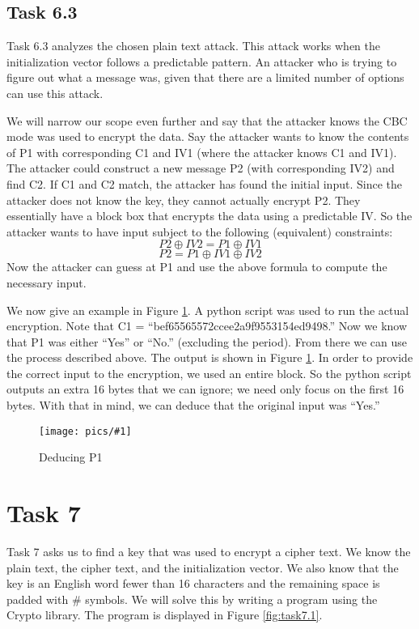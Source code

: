 \documentclass[11pt]{article}
\newcommand{\fig}[2]{ 
\begin{figure}[h]
	\centering
	\caption{#2}
	\texttt{[image: pics/\#1]}
	\label{fig:#1}
\end{figure} 
}
\begin{document}
\subsection*{Task 6.3}

Task 6.3 analyzes the chosen plain text attack. This attack works when the initialization vector follows a predictable pattern. An attacker who is trying to figure out what a message was, given that there are a limited number of options can use this attack.

We will narrow our scope even further and say that the attacker knows the CBC mode was used to encrypt the data. Say the attacker wants to know the contents of P1 with corresponding C1 and IV1 (where the attacker knows C1 and IV1). The attacker could construct a new message P2 (with corresponding IV2) and find C2. If C1 and C2 match, the attacker has found the initial input. Since the attacker does not know the key, they cannot actually encrypt P2. They essentially have a block box that encrypts the data using a predictable IV. So the attacker wants to have input subject to the following (equivalent) constraints:
$$ P2 \oplus IV2 = P1 \oplus IV1 $$
$$ P2 = P1 \oplus IV1 \oplus IV2 $$
Now the attacker can guess at P1 and use the above formula to compute the necessary input.

We now give an example in Figure \ref{fig:task6.3.1}. A python script was used to run the actual encryption. Note that C1 = ``bef65565572ccee2a9f9553154ed9498.'' Now we know that P1 was either ``Yes'' or ``No.'' (excluding the period). From there we can use the process described above. The output is shown in Figure \ref{fig:task6.3.1}. In order to provide the correct input to the encryption, we used an entire block. So the python script outputs an extra 16 bytes that we can ignore; we need only focus on the first 16 bytes. With that in mind, we can deduce that the original input was ``Yes.''

\fig{task6.3.1}{Deducing P1}

\newpage
\section*{Task 7}

Task 7 asks us to find a key that was used to encrypt a cipher text. We know the plain text, the cipher text, and the initialization vector. We also know that the key is an English word fewer than 16 characters and the remaining space is padded with \# symbols. We will solve this by writing a program using the Crypto library. The program is displayed in Figure \ref{fig:task7.1}.
\end{document}
